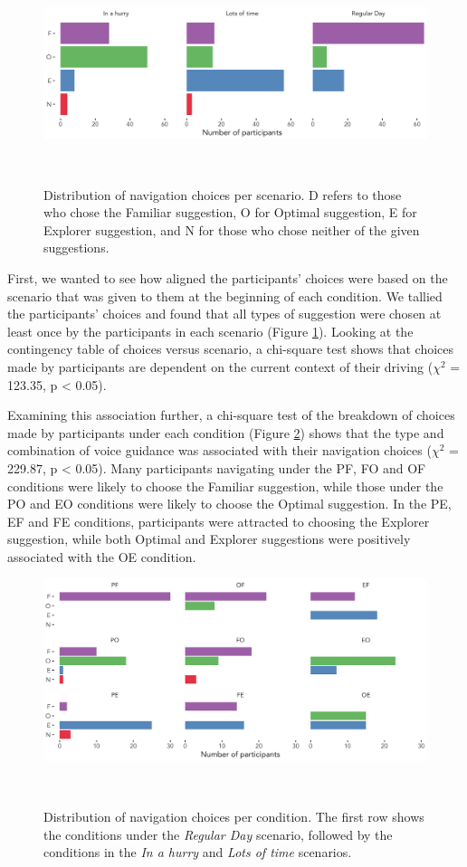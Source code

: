 \begin{figure}
\centering
  \includegraphics[scale=0.4]{figures/s2-choice_per_scenario.png}
  \caption{Distribution of navigation choices per scenario. D refers to those who chose the Familiar suggestion, O for Optimal suggestion, E for Explorer suggestion, and N for those who chose neither of the given suggestions.}~\label{fig:scenario-choice}
\end{figure}

First, we wanted to see how aligned the participants' choices were based on the scenario that was given to them at the beginning of each condition. We tallied the participants' choices and found that all types of suggestion were chosen at least once by the participants in each scenario (Figure \ref{fig:scenario-choice}). Looking at the contingency table of choices versus scenario, a chi-square test shows that choices made by participants are dependent on the current context of their driving ($\chi^2$ = 123.35, p < 0.05). 

Examining this association further, a chi-square test of the breakdown of choices made by participants under each condition (Figure \ref{fig:cond-choice}) shows that the type and combination of voice guidance was associated with their navigation choices ($\chi^2$ = 229.87, p < 0.05). Many participants navigating under the PF, FO and OF conditions were likely to choose the Familiar suggestion, while those under the PO and EO conditions were likely to choose the Optimal suggestion. In the PE, EF and FE conditions, participants were attracted to choosing the Explorer suggestion, while both Optimal and Explorer suggestions were positively associated with the OE condition.

\begin{figure}
\centering
  \includegraphics[scale=0.4]{figures/s2-choice_per_condition.png}
  \caption{Distribution of navigation choices per condition. The first row shows the conditions under the \textit{Regular Day} scenario, followed by the conditions in the \textit{In a hurry} and \textit{Lots of time} scenarios.}~\label{fig:cond-choice}
\end{figure}

